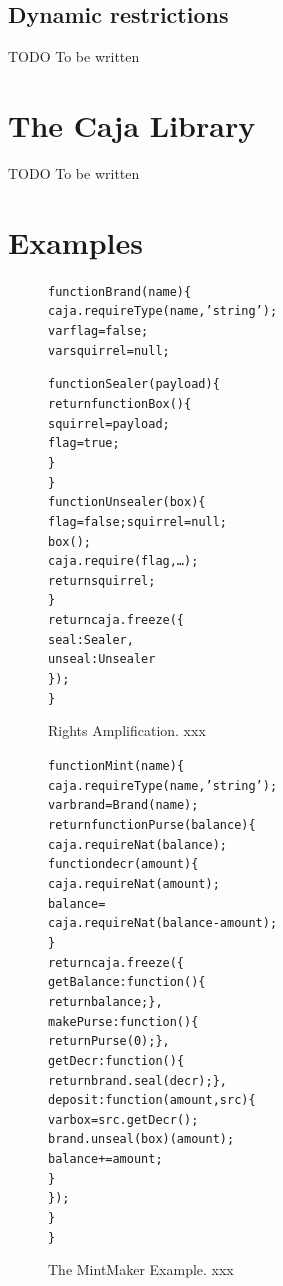 \documentclass[letterpaper,twocolumn,10pt]{article}
\begin{document}
\subsection{Dynamic restrictions}

TODO To be written

\section{The Caja Library}

TODO To be written

\section{Examples}

\begin{figure}
\begin{alltt}
function Brand(name) \{
  caja.requireType(name,'string');
  var flag = false;
  var squirrel = null;

  function Sealer(payload) \{
    return function Box() \{
      squirrel = payload;
      flag = true;
    \}
  \}
  function Unsealer(box) \{
    flag = false; squirrel = null;
    box();
    caja.require(flag,\ldots);
    return squirrel;
  \}
  return caja.freeze(\{
    seal: Sealer,
    unseal: Unsealer
  \});
\}
\end{alltt}

\caption[Rights Amplification]{Rights Amplification. xxx}
\label{fig:rights-amp}
\end{figure}

\begin{figure}
\begin{alltt}
function Mint(name) \{
  caja.requireType(name,'string');
  var brand = Brand(name);
  return function Purse(balance) \{
    caja.requireNat(balance);
    function decr(amount) \{
      caja.requireNat(amount);
      balance = 
        caja.requireNat(balance - amount);
    \}
    return caja.freeze(\{
      getBalance: function() \{
        return balance; \},
      makePurse:  function() \{
        return Purse(0); \},
      getDecr:    function() \{
        return brand.seal(decr); \},
      deposit: function(amount,src) \{
        var box = src.getDecr();
        brand.unseal(box)(amount);
        balance += amount;
      \}
    \});
  \}
\}
\end{alltt}

\caption[The MintMaker Example]{The MintMaker Example. xxx}
\label{fig:mintmaker}
\end{figure}
\end{document}
